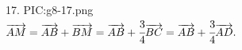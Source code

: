 17. {{PIC:g8-17.png}}\\
$\overrightarrow{AM}=\overrightarrow{AB}+\overrightarrow{BM}=\overrightarrow{AB}+\cfrac{3}{4}\overrightarrow{BC}=
\overrightarrow{AB}+\cfrac{3}{4}\overrightarrow{AD}.$\\
